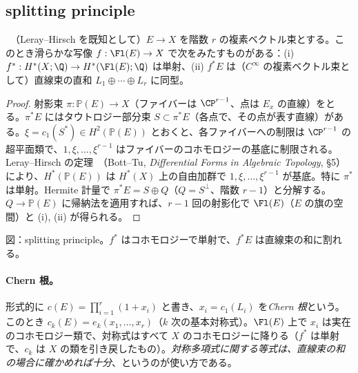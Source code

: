 \subsection{splitting principle}
\begin{prop}\label{prop:split}\tP\ （Leray--Hirsch を既知として）$E\to X$ を階数 $r$ の複素ベクトル束とする。このとき滑らかな写像 $f:\Fl(E)\to X$ で次をみたすものがある：(i) $f^*:H^*(X;\Q)\to H^*(\Fl(E);\Q)$ は単射、(ii) $f^*E$ は（$C^\infty$ の複素ベクトル束として）直線束の直和 $L_1\oplus\cdots\oplus L_r$ に同型。
\end{prop}
\begin{proof}
射影束 $\pi:\mathbb P(E)\to X$（ファイバーは $\CP^{r-1}$、点は $E_x$ の直線）をとる。$\pi^*E$ にはタウトロジー部分束 $S\subset\pi^*E$（各点で、その点が表す直線）がある。$\xi=c_1(S^*)\in H^2(\mathbb P(E))$ とおくと、各ファイバーへの制限は $\CP^{r-1}$ の超平面類で、$1,\xi,\dots,\xi^{r-1}$ はファイバーのコホモロジーの基底に制限される。Leray--Hirsch の定理\tC\ （Bott--Tu, \emph{Differential Forms in Algebraic Topology}, §5）により、$H^*(\mathbb P(E))$ は $H^*(X)$ 上の自由加群で $1,\xi,\dots,\xi^{r-1}$ が基底。特に $\pi^*$ は単射。Hermite 計量で $\pi^*E=S\oplus Q$（$Q=S^\perp$、階数 $r-1$）と分解する。$Q\to\mathbb P(E)$ に帰納法を適用すれば、$r-1$ 回の射影化で $\Fl(E)$（$E$ の旗の空間）と (i), (ii) が得られる。
\end{proof}
\begin{center}
\end{center}
{\small 図：splitting principle。$f^*$ はコホモロジーで単射で、$f^*E$ は直線束の和に割れる。}

\paragraph{Chern 根。}形式的に $c(E)=\prod_{i=1}^r(1+x_i)$ と書き、$x_i=c_1(L_i)$ を\emph{Chern 根}という。このとき $c_k(E)=e_k(x_1,\dots,x_r)$（$k$ 次の基本対称式）。$\Fl(E)$ 上で $x_i$ は実在のコホモロジー類で、対称式はすべて $X$ のコホモロジーに降りる（$f^*$ は単射で、$c_k$ は $X$ の類を引き戻したもの）。\emph{対称多項式に関する等式は、直線束の和の場合に確かめれば十分}、というのが使い方である。


